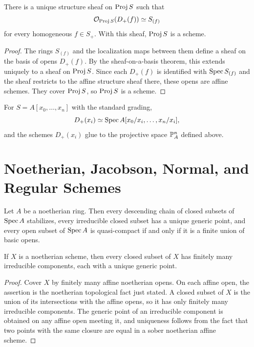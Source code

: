 \begin{proposition}
There is a unique structure sheaf on \(\operatorname{Proj} S\) such that
\[
    \mathcal{O}_{\operatorname{Proj} S}(D_+(f))\simeq S_{(f)}
\]
for every homogeneous \(f\in S_+\).  With this sheaf, \(\operatorname{Proj} S\) is a scheme.
\end{proposition}

\begin{proof}
The rings \(S_{(f)}\) and the localization maps between them define a sheaf on
the basis of opens \(D_+(f)\).  By the sheaf-on-a-basis theorem, this extends
uniquely to a sheaf on \(\operatorname{Proj} S\).  Since each \(D_+(f)\) is identified with
\(\operatorname{Spec} S_{(f)}\) and the sheaf restricts to the affine structure sheaf there,
these opens are affine schemes.  They cover \(\operatorname{Proj} S\), so \(\operatorname{Proj} S\) is a
scheme.
\end{proof}

\begin{example}
For \(S=A[x_0,\ldots,x_n]\) with the standard grading,
\[
    D_+(x_i)\simeq
    \operatorname{Spec} A[x_0/x_i,\ldots,x_n/x_i],
\]
and the schemes \(D_+(x_i)\) glue to the projective space \(\mathbb{P}^n_A\) defined
above.
\end{example}

\section{Noetherian, Jacobson, Normal, and Regular Schemes}

\begin{fact}
Let \(A\) be a noetherian ring.  Then every descending chain of closed subsets
of \(\operatorname{Spec} A\) stabilizes, every irreducible closed subset has a unique generic
point, and every open subset of \(\operatorname{Spec} A\) is quasi-compact if and only if it
is a finite union of basic opens.
\end{fact}

\begin{proposition}
If \(X\) is a noetherian scheme, then every closed subset of \(X\) has finitely
many irreducible components, each with a unique generic point.
\end{proposition}

\begin{proof}
Cover \(X\) by finitely many affine noetherian opens.  On each affine open, the
assertion is the noetherian topological fact just stated.  A closed subset of
\(X\) is the union of its intersections with the affine opens, so it has only
finitely many irreducible components.  The generic point of an irreducible
component is obtained on any affine open meeting it, and uniqueness follows
from the fact that two points with the same closure are equal in a sober
noetherian affine scheme.
\end{proof}

